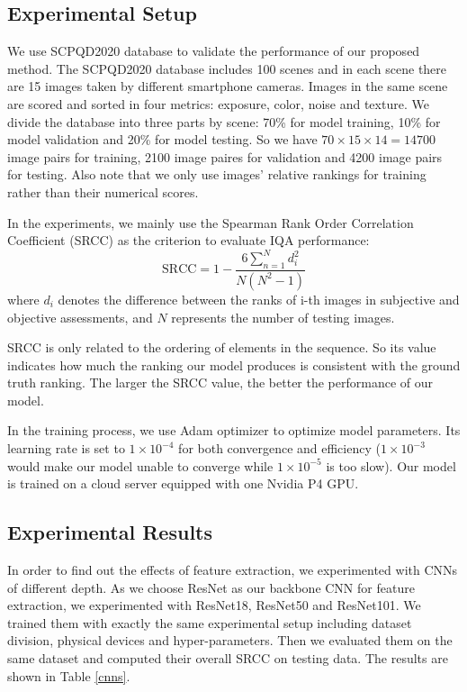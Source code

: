 \documentclass[journal]{IEEEtran}
\begin{document}
\subsection{Experimental Setup}
We use SCPQD2020 database \cite{9191104} to validate the performance of our proposed method. The SCPQD2020 database includes 100 scenes and in each scene there are 15 images taken by different smartphone cameras. Images in the same scene are scored and sorted in four metrics: exposure, color, noise and texture. We divide the database into three parts by scene: 70\% for model training, 10\% for model validation and 20\% for model testing. So we have $70 \times 15 \times 14 = 14700$ image pairs for training, 2100 image paires for validation and 4200 image pairs for testing. Also note that we only use images' relative rankings for training rather than their numerical scores.

In the experiments, we mainly use the Spearman Rank Order Correlation Coefficient (SRCC) as the criterion to evaluate IQA performance:
\begin{equation}
    \text{SRCC} = 1 - \frac{6\sum_{n=1}^{N}d_i^2}{N(N^2 - 1)}
\end{equation}
where $d_i$ denotes the difference between the ranks of i-th images in subjective and objective assessments, and $N$ represents the number of testing images.

SRCC is only related to the ordering of elements in the sequence. So its value indicates how much the ranking our model produces is consistent with the ground truth ranking. The larger the SRCC value, the better the performance of our model.

In the training process, we use Adam optimizer \cite{kingma2014adam} to optimize model parameters. Its learning rate is set to $1\times10^{-4}$ for both convergence and efficiency ($1\times10^{-3}$ would make our model unable to converge while $1\times10^{-5}$ is too slow). Our model is trained on a cloud server equipped with one Nvidia P4 GPU.

\subsection{Experimental Results}
In order to find out the effects of feature extraction, we experimented with CNNs of different depth. As we choose ResNet \cite{he2016deep} as our backbone CNN for feature extraction, we experimented with ResNet18, ResNet50 and ResNet101. We trained them with exactly the same experimental setup including dataset division, physical devices and hyper-parameters. Then we evaluated them on the same dataset and computed their overall SRCC on testing data. The results are shown in Table \ref{cnns}. 
\end{document}
